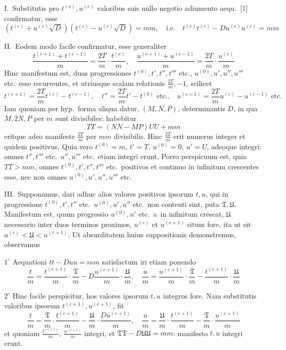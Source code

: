 \documentclass[12pt,a4paper]{article}
\theoremstyle{plain}
\theoremstyle{definition}
\theoremstyle{remark}
\begin{document}
I.\ Substitutis pro $t^{(e)},u^{(e)}$ valoribus suis nullo negotio adiumento aequ.\ [1] confirmatur, esse
\[(t^{(e)}+u^{(e)}\sqrt{D})(t^{(e)}-u^{(e)}\sqrt{D})=mm,\quad\text{i.e.}\quad t^{(e)}t^{(e)}-Du^{(e)}u^{(e)}=mm\]

II.\ Eodem modo facile confirmatur, esse generaliter
\[\frac{t^{(e+1)}+t^{(e-1)}}{m}=\frac{2T}{m}\cdot\frac{t^{(e)}}{m},\quad\frac{u^{(e+1)}+u^{(e-1)}}{m}=\frac{2T}{m}\cdot\frac{u^{(e)}}{m}\]
Hinc manifestum est, duas progressiones $t^{(0)},t',t'',t'''$ etc., $u^{(0)},u',u'',u'''$ etc.\ esse recurrentes, et utriusque scalam relationis $\frac{2T}{m},-1$, scilicet
\[t^{(e+1)}=\frac{2T}{m}t^{(e)}-t^{(e-1)},\quad t''=\frac{2T}{m}t'-t^{(0)}\text{ etc.,}\quad u^{(e+1)}=\frac{2T}{m}u^{(e)}-u^{(e-1)}\text{ etc.}\]
Iam quoniam per hyp.\ forma aliqua datur, $(M,N,P)$, determinantis $D$, in qua $M,2N,P$ per $m$ sunt divisibiles: habebitur
\[TT=(NN-MP)UU+mm\]
eritque adeo manifeste $\frac{2T}{m}$ per $mm$ divisibilis. Hinc $\frac{2T}{m}$ erit numerus integer et quidem positivus. Quia vero $t^{(0)}=m$, $t'=T$, $u^{(0)}=0$, $u'=U$, adeoque integri: omnes $t'',t'''$ etc.\ $u'',u'''$ etc.\ etiam integri erunt. Porro perspicuum est, quia $TT>mm$, omnes $t^{(0)},t',t'',t'''$ etc.\ positivos et continuo in infinitum crescentes esse, nec non omnes $u^{(0)},u',u'',u'''$ etc.

III.\ Supponamus, dari adhuc alios valores positivos ipsorum $t,u$, qui in progressione $t^{(0)},t',t''$ etc.\ $u^{(0)},u',u''$ etc.\ non contenti sint, puta $\mathfrak{T},\mathfrak{U}$. Manifestum est, quum progressio $u^{(0)},u'$ etc.\ a\ in infinitum crescat, $\mathfrak{U}$ necessario inter duos terminos proximos, $u^{(e)}$ et $u^{(e+1)}$ situm fore, ita ut sit $u^{(e)}<\mathfrak{U}<u^{(e+1)}$. Ut absurditatem huius suppositionis demonstremus, observamus

$1^\circ$ Aequationi $tt-Duu=mm$ satisfactum iri etiam ponendo
\[\frac{t}{m}=\frac{t^{(e+1)}}{m}\cdot\frac{\mathfrak{T}}{m}-D\frac{u^{(e+1)}}{m}\cdot\frac{\mathfrak{U}}{m},\quad
\frac{u}{m}=\frac{u^{(e+1)}}{m}\cdot\frac{\mathfrak{T}}{m}-\frac{t^{(e+1)}}{m}\cdot\frac{\mathfrak{U}}{m}\]

$2^\circ$ Hinc facile perspicitur, hos valores ipsorum $t,u$ integros fore. Nam substitutis valoribus ipsorum $t^{(e+1)},u^{(e+1)}$, fit
\[\frac{t}{m}=\frac{\mathfrak{T}}{m}\cdot\frac{t^{(e+1)}}{m}-\frac{\mathfrak{U}}{m}\cdot\frac{Du^{(e+1)}}{m},\quad
\frac{u}{m}=\frac{\mathfrak{U}}{m}\cdot\frac{t^{(e+1)}}{m}-\frac{\mathfrak{T}}{m}\cdot\frac{u^{(e+1)}}{m}\]
et quoniam $\frac{t^{(e+1)}}{m}$, $\frac{u^{(e+1)}}{m}$ integri, et $\mathfrak{T}\mathfrak{T}-D\mathfrak{U}\mathfrak{U}=mm$: manifesto $t,u$ integri erunt.
\end{document}
